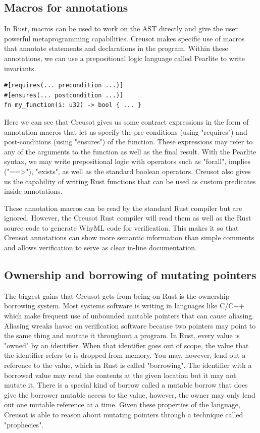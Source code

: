 \documentclass[12pt]{article}
\begin{document}
\subsection{Macros for annotations}
In Rust, macros can be used to work on the AST directly and give the user powerful metaprogramming capabilities. 
Creusot makes specific use of macros that annotate statements and declarations in the program. 
Within these annotations, we can use a prepositional logic language called Pearlite to write invariants. 
\begin{verbatim}
#[requires(... precondition ...)]
#[ensures(... postcondition ...)]
fn my_function(i: u32) -> bool { ... }
\end{verbatim}

Here we can see that Creusot gives us some contract expressions in the form of annotation macros that let us specify the pre-conditions (using "requires") and post-conditions (using "ensures") of the function. 
These expressions may refer to any of the arguments to the function as well as the final result. 
With the Pearlite syntax, we may write prepositional logic with operators such as "forall", implies ("==>"), "exists", as well as the standard boolean operators. 
Creusot also gives us the capability of writing Rust functions that can be used as custom predicates inside annotations. 

These annotation macros can be read by the standard Rust compiler but are ignored. 
However, the Creusot Rust compiler will read them as well as the Rust source code to generate WhyML code for verification. 
This makes it so that Creusot annotations can show more semantic information than simple comments and allows verification to serve as clear in-line documentation. 

\subsection{Ownership and borrowing of mutating pointers}
The biggest gains that Creusot gets from being on Rust is the ownership-borrowing system. 
Most systems software is writing in languages like C/C++ which make frequent use of unbounded mutable pointers that can cause aliasing. 
Aliasing wreaks havoc on verification software because two pointers may point to the same thing and mutate it throughout a program. 
In Rust, every value is "owned" by an identifier. When that identifier goes out of scope, the value that the identifier refers to is dropped from memory.
You may, however, lend out a reference to the value, which in Rust is called "borrowing". 
The identifier with a borrowed value may read the contents at the given location but it may not mutate it. 
There is a special kind of borrow called a mutable borrow that does give the borrower mutable access to the value, however, the owner may only lend out one mutable reference at a time.   
Given these properties of the language, Creusot is able to reason about mutating pointers through a technique called "prophecies".
\end{document}
